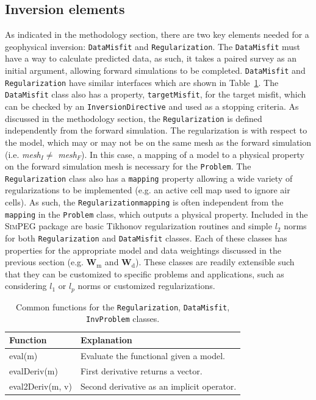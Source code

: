 \documentclass[preprint,review,3p,times,onecolumn,authoryear]{elsarticle}
\newcommand{\SimPEG}{\textsc{SimPEG}\xspace}
\newcommand{\Problem}{\texttt{Problem}\xspace}
\newcommand{\Regularization}{\texttt{Regularization}\xspace}
\newcommand{\DataMisfit}{\texttt{DataMisfit}\xspace}
\newcommand{\InvProblem}{\texttt{InvProblem}\xspace}
\newcommand{\meshI}{\emph{mesh}$_I$\xspace}
\newcommand{\meshF}{\emph{mesh}$_F$\xspace}
\newcommand{\Wd}{\mathbf{W}_\text{d}}
\newcommand{\Wm}{\mathbf{W}_\text{m}}
\begin{document}

\subsection{Inversion elements}

As indicated in the methodology section, there are two key elements needed for
a geophysical inversion: \DataMisfit and \Regularization.
The \DataMisfit must have a way to calculate predicted data, as such, it takes a paired
survey as an initial argument, allowing forward simulations to be completed.
\DataMisfit and \Regularization have similar interfaces which are shown in Table~\ref{table:Dmis_and_Reg}.
The \DataMisfit class also has a property, \texttt{targetMisfit}, for the target misfit, which
can be checked by an \texttt{InversionDirective} and used as a stopping criteria.
As discussed in the methodology section, the \Regularization is defined independently
from the forward simulation. The regularization is with respect to the model, which may or may not be on the same mesh as the forward simulation (i.e. \meshI $\ne$ \meshF).
In this case, a mapping of a model to a physical property on the forward simulation mesh is necessary for the \Problem.
The \Regularization class also has a \texttt{mapping} property allowing a wide variety of regularizations to be implemented (e.g. an active cell map used to ignore air cells).
As such, the \Regularization \texttt{mapping} is often independent from the \texttt{mapping} in the \Problem class, which outputs a physical property.
Included in the \SimPEG package are basic Tikhonov regularization routines and simple
$l_2$ norms for both \Regularization and \DataMisfit classes.
Each of these classes has properties for the appropriate model and data weightings discussed in the previous section (e.g. $\Wm$ and $\Wd$).
These classes are readily extensible such that they can be customized to specific problems and applications, such as considering $l_1$ or $l_p$ norms or customized regularizations.

{%
\begin{table}[ht]
\caption{Common functions for the \Regularization, \DataMisfit, \InvProblem classes.}
\scriptsize
\label{table:Dmis_and_Reg}
  \begin{tabular}{  p{2.5cm}  p{4.5cm} }
    \hline

    Function & Explanation \\ \hline

    eval(m)          & Evaluate the functional given a model.\\
    evalDeriv(m)     & First derivative returns a vector.\\
    eval2Deriv(m, v) & Second derivative as an implicit operator.\\

    \hline
  \end{tabular}
\end{table}
}
\end{document}
